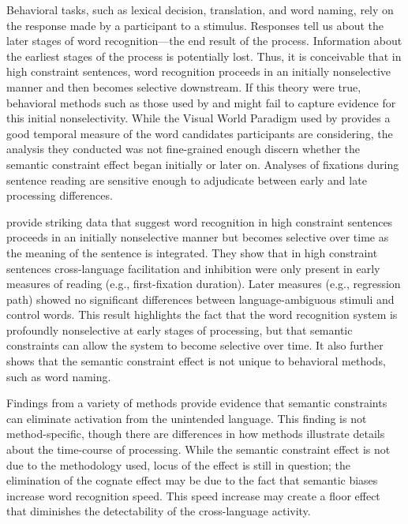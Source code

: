 Behavioral tasks, such as lexical decision, translation, and word naming, rely on the response made by a participant to a stimulus. Responses  tell us about the later stages of word recognition---the end result of the process. Information about the  earliest stages of the process is potentially lost. Thus, it is conceivable that in high constraint sentences, word recognition  proceeds in an initially nonselective manner and then becomes selective downstream. If this theory were true, behavioral methods such as those used by \textcite{Schwartz2006} and \textcite{VanHell2008} might fail to capture evidence for this initial nonselectivity. While the Visual World Paradigm used by \textcite{Chambers2009} provides a good temporal measure of the word candidates participants are considering, the analysis they conducted was not fine-grained enough discern whether the semantic constraint effect began initially or later on. Analyses of fixations during sentence reading are sensitive enough to adjudicate between early and late processing differences.  
 
\textcite{Libben2009} provide striking data that suggest word recognition in high constraint sentences proceeds in an initially nonselective manner but becomes selective over time as the meaning of the sentence is integrated. They show that in high constraint sentences cross-language facilitation and inhibition were only present in early measures of reading (e.g., first-fixation duration). Later measures (e.g., regression path) showed no significant differences between language-ambiguous stimuli and control words. This result highlights the fact that the word recognition system is profoundly nonselective at early stages of processing, but that semantic constraints can allow the system to become selective over time. It also further shows that the semantic constraint effect is not unique to behavioral methods, such as word naming. 

Findings from a variety of methods provide evidence that semantic constraints can eliminate activation from the unintended language. This finding is not method-specific, though there are differences in how methods illustrate details about the time-course of processing. While the semantic constraint effect is not due to the methodology used,  locus of the effect is still in question; the elimination of the cognate effect may be due to the fact that semantic biases increase word recognition speed. This speed increase may create a floor effect that diminishes the detectability of the cross-language activity. 

